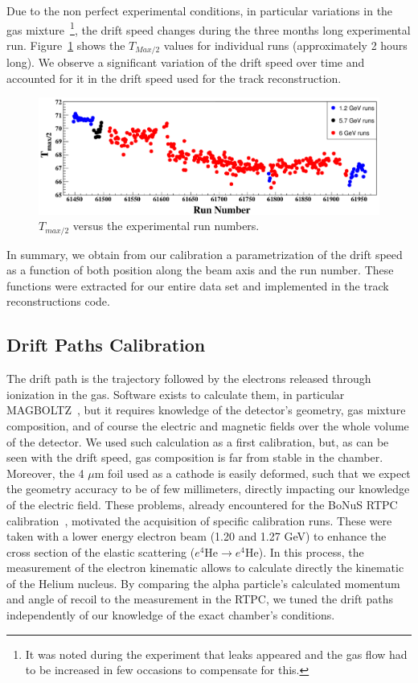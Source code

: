 \documentclass[preprint,5p]{elsarticle}
\begin{document}
Due to the non perfect experimental conditions, in particular variations in the 
gas mixture~\footnote{It was noted during the experiment that leaks appeared
and the gas flow had to be increased in few occasions to compensate for this.}, 
the drift speed changes during the three months long experimental run.  
Figure~\ref{fig:Drift_run_number_1} shows the $T_{Max/2}$ values for 
individual runs (approximately 2 hours long). We observe a significant 
variation of the drift speed over time and accounted for it in the drift 
speed used for the track reconstruction. 

\begin{figure}[tb]
\centering
\includegraphics[width=16.5cm]{fig_2017/Drift_run_number.pdf}
\caption{$T_{max/2}$ versus the experimental run numbers.} 
\label{fig:Drift_run_number_1}
\end{figure}


In summary, we obtain from our calibration a parametrization of the drift speed 
as a function of both position along the beam axis and the run number. These 
functions were extracted for our entire data set and implemented in the 
track reconstructions code.
   
\subsection{Drift Paths Calibration}

The drift path is the trajectory followed by the electrons released through 
ionization in the gas. Software exists to calculate them, in particular
MAGBOLTZ~\cite{MAGBOLTZ}, but it requires knowledge of the detector's 
geometry, gas mixture composition, and of course the electric and magnetic 
fields over the whole volume of the detector. We used such calculation as a 
first calibration, but, 
as can be seen with the drift speed, gas composition is far from stable in the 
chamber. Moreover, the 4 $\mu$m foil used as a cathode is easily deformed, such
that we expect the geometry accuracy to be of few millimeters, directly impacting 
our knowledge of the electric field. These problems, already 
encountered for the BoNuS RTPC calibration~\cite{BONUS-NIM}, motivated the 
acquisition of specific calibration runs. These were taken with a lower energy 
electron beam (1.20 and 1.27 GeV) to enhance the cross section of the elastic 
scattering ($e^{4}$He$\rightarrow e^{4}$He). In this process, the measurement of
the electron kinematic allows to calculate directly the kinematic of the Helium nucleus. 
By comparing the alpha particle's calculated momentum and angle of recoil to the 
measurement in the RTPC, we tuned the drift paths independently of our 
knowledge of the exact chamber's conditions.
\end{document}
